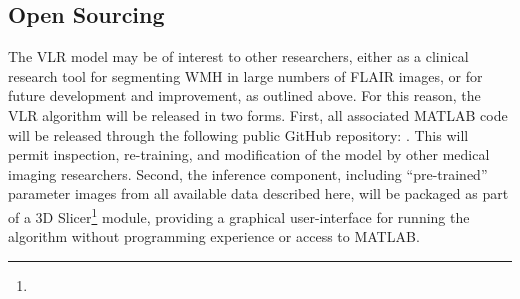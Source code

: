 \subsection{Open Sourcing}
The VLR model may be of interest to other researchers, either
as a clinical research tool for segmenting WMH in large numbers of FLAIR images,
or for future development and improvement, as outlined above.
For this reason, the VLR algorithm will be released in two forms.
First, all associated MATLAB code will be released through the following public GitHub repository:
.
This will permit inspection, re-training, and modification of the model
by other medical imaging researchers.
Second, the inference component, including ``pre-trained'' parameter images
from all available data described here,
will be packaged as part of a 3D Slicer\footnote{} module,
providing a graphical user-interface for running the algorithm
without programming experience or access to MATLAB.
